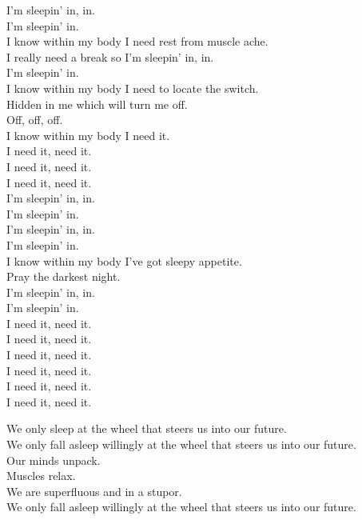 


I'm sleepin' in, in. \\
I'm sleepin' in. \\
I know within my body I need rest from muscle ache. \\
I really need a break so I'm sleepin' in, in. \\
I'm sleepin' in. \\
I know within my body I need to locate the switch. \\
Hidden in me which will turn me off. \\
Off, off, off. \\
I know within my body I need it. \\

I need it, need it. \\
I need it, need it. \\
I need it, need it. \\

I'm sleepin' in, in. \\
I'm sleepin' in. \\
I'm sleepin' in, in. \\
I'm sleepin' in. \\
I know within my body I've got sleepy appetite. \\
Pray the darkest night. \\
I'm sleepin' in, in. \\
I'm sleepin' in. \\

I need it, need it. \\
I need it, need it. \\
I need it, need it. \\
I need it, need it. \\
I need it, need it. \\
I need it, need it. \\




We only sleep at the wheel that steers us into our future. \\
We only fall asleep willingly at the wheel that steers us into our future. \\
Our minds unpack. \\
Muscles relax. \\
We are superfluous and in a stupor. \\
We only fall asleep willingly at the wheel that steers us into our future. \\

